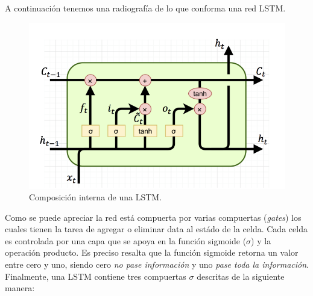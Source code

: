 \documentclass[12pt, letterpaper]{article}
\begin{document}
        A continuación tenemos una radiografía de lo que conforma una red LSTM.
        \begin{figure}[H]
            \centering
            \includegraphics[width=0.7\linewidth]{img/LSTM3-cell-A.png}
            \caption{Composición interna de una LSTM.}
        \end{figure}

        Como se puede apreciar la red está compuerta por varias compuertas (\emph{gates}) los cuales tienen la tarea de agregar o eliminar data al estádo de la celda. Cada celda es controlada por una capa que se apoya en la función sigmoide ($\sigma$) y la operación producto. Es preciso resalta que la función sigmoide retorna un valor entre cero y uno, siendo cero \emph{no pase información} y uno \emph{pase toda la información}. Finalmente, una LSTM contiene tres compuertas $\sigma$ descritas de la siguiente manera:
\end{document}
